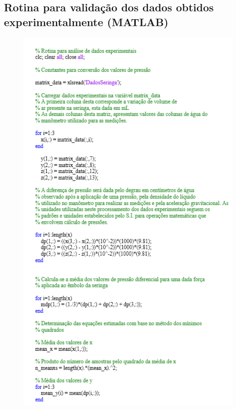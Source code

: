 \begin{apendicesenv}
\chapter{Rotina para validação dos dados obtidos experimentalmente (MATLAB)}

\begin{figure}[H]
		\centering
			\includegraphics[scale=1.0]{figuras/rotina1.png}
		\label{rotina1}
\end{figure}


\end{apendicesenv}
